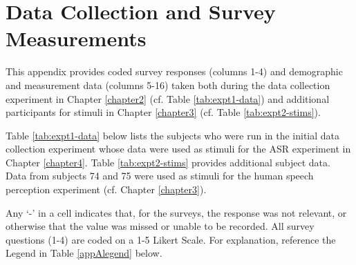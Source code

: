 % 
% 
% 


% 
\chapter{Data Collection and Survey Measurements}\label{appendixA}

This appendix provides coded survey responses (columns 1-4) and demographic and measurement data (columns 5-16) taken both during the data collection experiment in Chapter \ref{chapter2} (cf. Table \ref{tab:expt1-data}) and additional participants for stimuli in Chapter \ref{chapter3} (cf. Table \ref{tab:expt2-stims}).

Table \ref{tab:expt1-data} below lists the subjects who were run in the initial data collection experiment whose data were used as stimuli for the ASR experiment in Chapter \ref{chapter4}.  Table \ref{tab:expt2-stims} provides additional subject data.  Data from subjects 74 and 75 were used as stimuli for the human speech perception experiment (cf. Chapter \ref{chapter3}).  %

Any `-' in a cell indicates that, for the surveys, the response was not relevant, or otherwise that the value was missed or unable to be recorded.  All survey questions (1-4) are coded on a 1-5 Likert Scale.  For explanation, reference the Legend in Table \ref{appAlegend} below.

